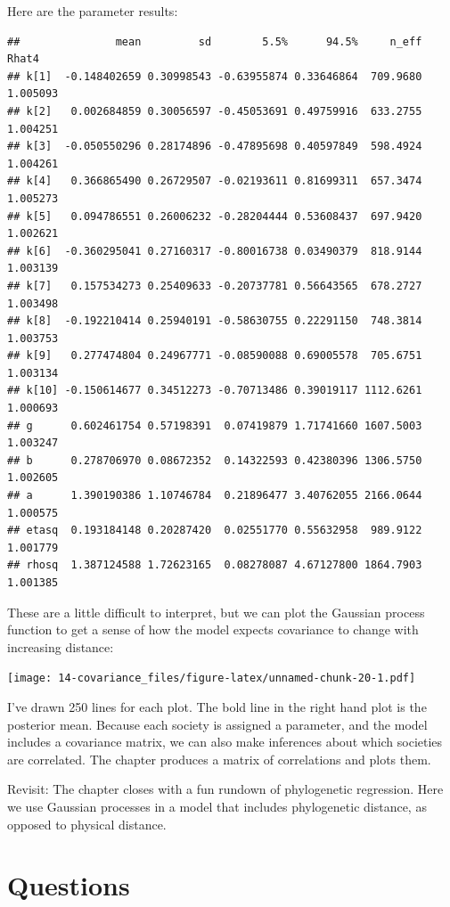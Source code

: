 \documentclass[
]{book}
\begin{document}
Here are the parameter results:

\begin{verbatim}
##               mean         sd        5.5%      94.5%     n_eff    Rhat4
## k[1]  -0.148402659 0.30998543 -0.63955874 0.33646864  709.9680 1.005093
## k[2]   0.002684859 0.30056597 -0.45053691 0.49759916  633.2755 1.004251
## k[3]  -0.050550296 0.28174896 -0.47895698 0.40597849  598.4924 1.004261
## k[4]   0.366865490 0.26729507 -0.02193611 0.81699311  657.3474 1.005273
## k[5]   0.094786551 0.26006232 -0.28204444 0.53608437  697.9420 1.002621
## k[6]  -0.360295041 0.27160317 -0.80016738 0.03490379  818.9144 1.003139
## k[7]   0.157534273 0.25409633 -0.20737781 0.56643565  678.2727 1.003498
## k[8]  -0.192210414 0.25940191 -0.58630755 0.22291150  748.3814 1.003753
## k[9]   0.277474804 0.24967771 -0.08590088 0.69005578  705.6751 1.003134
## k[10] -0.150614677 0.34512273 -0.70713486 0.39019117 1112.6261 1.000693
## g      0.602461754 0.57198391  0.07419879 1.71741660 1607.5003 1.003247
## b      0.278706970 0.08672352  0.14322593 0.42380396 1306.5750 1.002605
## a      1.390190386 1.10746784  0.21896477 3.40762055 2166.0644 1.000575
## etasq  0.193184148 0.20287420  0.02551770 0.55632958  989.9122 1.001779
## rhosq  1.387124588 1.72623165  0.08278087 4.67127800 1864.7903 1.001385
\end{verbatim}

These are a little difficult to interpret, but we can plot the Gaussian process function to get a sense of how the model expects covariance to change with increasing distance:

\texttt{[image: 14-covariance\_files/figure-latex/unnamed-chunk-20-1.pdf]}

I've drawn 250 lines for each plot. The bold line in the right hand plot is the posterior mean. Because each society is assigned a parameter, and the model includes a covariance matrix, we can also make inferences about which societies are correlated. The chapter produces a matrix of correlations and plots them.

Revisit: The chapter closes with a fun rundown of phylogenetic regression. Here we use Gaussian processes in a model that includes phylogenetic distance, as opposed to physical distance.

\hypertarget{questions-13}{%
\section{Questions}\label{questions-13}}
\end{document}
